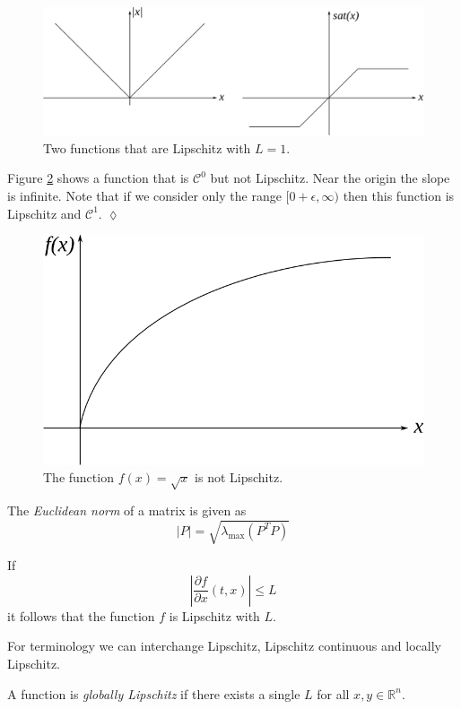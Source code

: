 \begin{figure}[ht!]
	\centering
	\includegraphics[width=.7\textwidth]{images/05lip}
	\caption{Two functions that are Lipschitz with $L=1$.}
	\label{fig:05lip}
\end{figure}

\begin{example}
Figure \ref{fig:05notlip} shows a function that is $\mathcal{C}^0$ but not Lipschitz. Near the origin the slope is infinite. Note that if we consider only the range $[0+\epsilon,\infty)$ then this function is Lipschitz and $\mathcal{C}^1$.
$\lozenge$
\end{example}

\begin{figure}[ht!]
	\centering
	\includegraphics[width=.5\textwidth]{images/05notlip}
	\caption{The function $f(x) = \sqrt{x}$ is not Lipschitz.}
	\label{fig:05notlip}
\end{figure}

\begin{definition}
The \textit{Euclidean norm} of a matrix is given as
$$|P| = \sqrt{\lambda_{\text{max}}(P^TP)}$$
\end{definition}

\begin{lemma}
If
$$\left|\frac{\partial f}{\partial x}(t,x)\right| \leq L$$
it follows that the function $f$ is Lipschitz with $L$.
\end{lemma}
For terminology we can interchange Lipschitz, Lipschitz continuous and locally Lipschitz.

\begin{definition}
A function is \textit{globally Lipschitz} if there exists a single $L$ for all $x,y\in\mathbb{R}^n$.
\end{definition}

